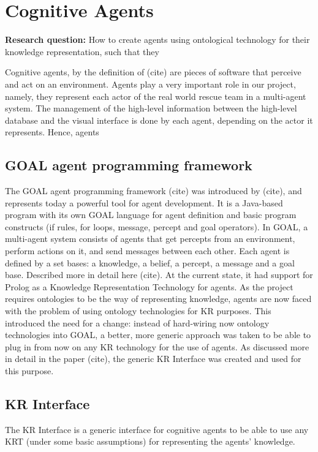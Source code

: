 \chapter{Cognitive Agents}

\textbf{Research question:} How to create agents using ontological technology for their knowledge representation, such that they 

Cognitive agents, by the definition of (cite) are pieces of software that perceive and act on an environment. Agents play a very important role in our project, namely, they represent each actor of the real world rescue team in a multi-agent system. The management of the high-level information between the high-level database and the visual interface is done by each agent, depending on the actor it represents. Hence, agents 

\section{GOAL agent programming framework}

The GOAL agent programming framework (cite) was introduced by (cite), and represents today a powerful tool for agent development. It is a Java-based program with its own GOAL language for agent definition and basic program constructs (if rules, for loops, message, percept and goal operators). 
In GOAL, a multi-agent system consists of agents that get percepts from an environment, perform actions on it, and send messages between each other. Each agent is defined by a set bases: a knowledge, a belief, a percept, a message and a goal base. Described more in detail here (cite).
At the current state, it had support for Prolog as a Knowledge Representation Technology for agents. 
As the project requires ontologies to be the way of representing knowledge, agents are now faced with the problem of using ontology technologies for KR purposes. This introduced the need for a change: instead of hard-wiring now ontology technologies into GOAL, a better, more generic approach was taken to be able to plug in from now on any KR technology for the use of agents. As discussed more in detail in the paper (cite), the generic KR Interface was created and used for this purpose.

\section{KR Interface}

The KR Interface is a generic interface for cognitive agents to be able to use any KRT (under some basic assumptions) for representing the agents' knowledge. 


